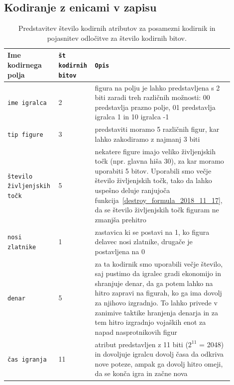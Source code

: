 \documentclass[a4paper, 12pt]{book}
\begin{document}
\subsection{Kodiranje z enicami v zapisu}
\label{oneHotEncoder}
\begin{table}
	\begin{center}
		\begin{tabular}{p{0.19\linewidth}|p{0.13\linewidth}|p{0.58\linewidth}}
			Ime kodirnega polja                        & {\tt št kodirnih bitov} & {\tt Opis} \\ \hline
			{\tt ime igralca}                          & 2                       & figura na polju je lahko predstavljena s 2 biti zaradi treh različnih možnosti: 00 predstavlja prazno polje, 01 predstavlja igralca 1 in 10 igralca -1 \\
			{\tt tip figure}                           & 3                       & predstaviti moramo 5 različnih figur, kar lahko zakodiramo z najmanj 3 biti\\
			{\tt število življenjskih točk}            & 5                       & nekatere figure imajo veliko življenjskih točk (npr. glavna hiša 30), za kar moramo uporabiti 5 bitov. 
																                   Uporabili smo večje število življenjskih točk, tako da lahko uspešno deluje ranjujoča funkcija~\ref{destroy_formula_2018_11_17}, da se število življenjskih točk figuram ne zmanjša prehitro \\
			{\tt nosi zlatnike}                        & 1                       & zastavica ki se postavi na 1, ko figura delavec nosi zlatnike, drugače je postavljena na 0 \\
			{\tt denar}                                & 5                       & za ta kodirnik smo uporabili večje število, saj pustimo da igralec gradi ekonomijo in shranjuje denar, da ga potem lahko na hitro zapravi na figurah, ko ga ima dovolj za njihovo izgradnjo.
																                   To lahko privede v zanimive taktike hranjenja denarja in za tem hitro izgradnjo vojaških enot za napad nasprotnikovih figur \\
			{\tt čas igranja}                          & 11                      & atribut predstavljen z 11 biti ($2^{11}$ = 2048) in dovoljuje igralcu dovolj časa da odkriva nove poteze, ampak ga dovolj hitro omeji, da se konča igra in začne nova \\
		\end{tabular}
	\end{center}
	\caption{Predstavitev število kodirnih atributov za posamezni kodirnik in pojasnitev odločitve za število kodirnih bitov. }
	\label{tableEncodersOneHot}
\end{table}
\end{document}
